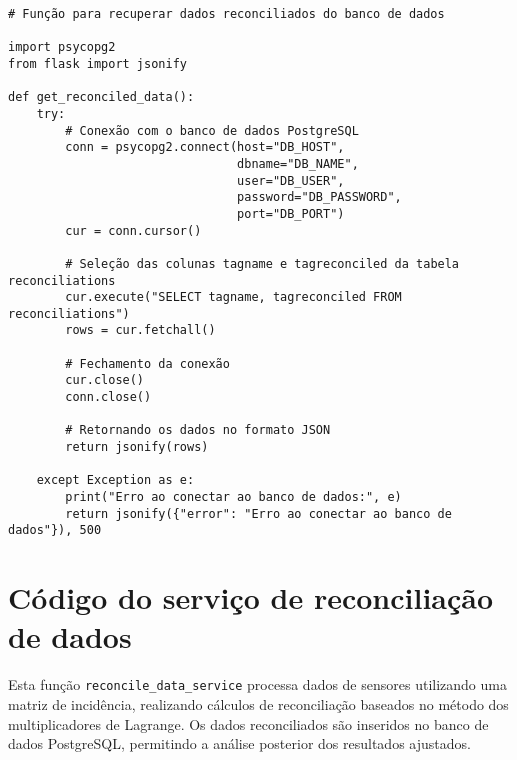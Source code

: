 \begin{verbatim}
# Função para recuperar dados reconciliados do banco de dados

import psycopg2
from flask import jsonify

def get_reconciled_data():
    try:
        # Conexão com o banco de dados PostgreSQL
        conn = psycopg2.connect(host="DB_HOST", 
                                dbname="DB_NAME", 
                                user="DB_USER", 
                                password="DB_PASSWORD",
                                port="DB_PORT")
        cur = conn.cursor()

        # Seleção das colunas tagname e tagreconciled da tabela reconciliations
        cur.execute("SELECT tagname, tagreconciled FROM reconciliations")
        rows = cur.fetchall()

        # Fechamento da conexão
        cur.close()
        conn.close()

        # Retornando os dados no formato JSON
        return jsonify(rows)
    
    except Exception as e:
        print("Erro ao conectar ao banco de dados:", e)
        return jsonify({"error": "Erro ao conectar ao banco de dados"}), 500
\end{verbatim}



\chapter{Código do serviço de reconciliação de dados}
\label{Anexo:CodigoReconciliacaoDados}

Esta função \texttt{reconcile\_data\_service} processa dados de sensores utilizando uma matriz de incidência, realizando cálculos de reconciliação baseados no método dos multiplicadores de Lagrange. Os dados reconciliados são inseridos no banco de dados PostgreSQL, permitindo a análise posterior dos resultados ajustados.

